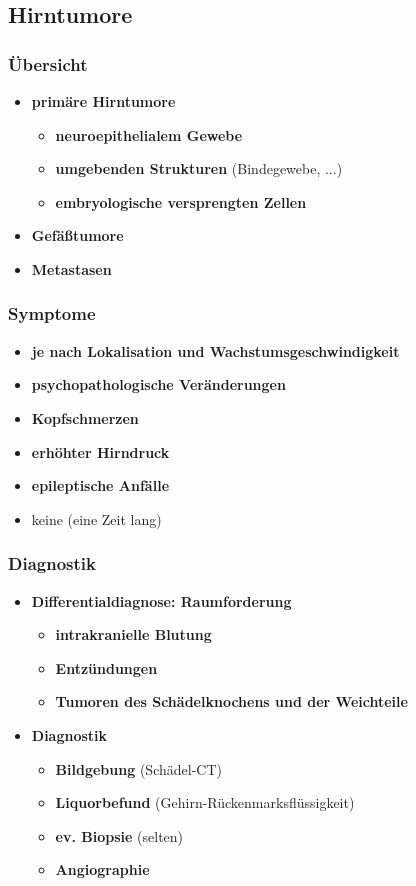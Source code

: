 \subsection{Hirntumore}
	\subsubsection{Übersicht}
		\begin{itemize}
			\item \textbf{primäre Hirntumore}
				\begin{itemize}
					\item \textbf{neuroepithelialem Gewebe}
					\item \textbf{umgebenden Strukturen} (Bindegewebe, $\dots$)
					\item \textbf{embryologische versprengten Zellen}
				\end{itemize}
			\item \textbf{Gefäßtumore}
			\item \textbf{Metastasen}
		\end{itemize}
	\subsubsection{Symptome}
		\begin{itemize}
			\item \textbf{je nach Lokalisation und Wachstumsgeschwindigkeit}
			\item \textbf{psychopathologische Veränderungen}
			\item \textbf{Kopfschmerzen}
			\item \textbf{erhöhter Hirndruck}
			\item \textbf{epileptische Anfälle}
			\item keine (eine Zeit lang)
		\end{itemize}
	\subsubsection{Diagnostik}
		\begin{itemize}
			\item \textbf{Differentialdiagnose: Raumforderung}
				\begin{itemize}
					\item \textbf{intrakranielle Blutung}
					\item \textbf{Entzündungen}
					\item \textbf{Tumoren des Schädelknochens und der Weichteile} 
				\end{itemize}
			\item \textbf{Diagnostik}
				\begin{itemize}
					\item \textbf{Bildgebung} (Schädel-CT)
					\item \textbf{Liquorbefund} (Gehirn-Rückenmarksflüssigkeit)
					\item \textbf{ev. Biopsie} (selten)
					\item \textbf{Angiographie}
				\end{itemize}
		\end{itemize}
